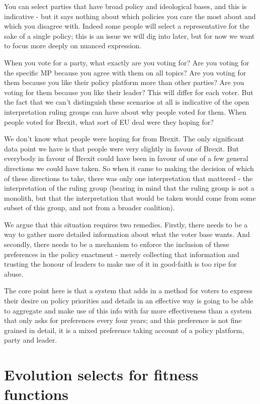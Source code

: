 \documentclass[twoside]{article}
\theoremstyle{definition}
\begin{document}
You can select parties that have broad policy and ideological bases, and this is indicative - but it says nothing about which policies you care the most about and which you disagree with. Indeed some people will select a representative for the sake of a single policy; this is an issue we will dig into later, but for now we want to focus more deeply on nuanced expression.

When you vote for a party, what exactly are you voting for? Are you voting for the specific MP because you agree with them on all topics? Are you voting for them because you like their policy platform more than other parties? Are you voting for them because you like their leader? This will differ for each voter. But the fact that we can’t distinguish these scenarios at all is indicative of the open interpretation ruling groups can have about why people voted for them. When people voted for Brexit, what sort of EU deal were they hoping for?

We don’t know what people were hoping for from Brexit. The only significant data point we have is that people were very slightly in favour of Brexit. But everybody in favour of Brexit could have been in favour of one of a few general directions we could have taken. So when it came to making the decision of which of these directions to take, there was only one interpretation that mattered - the interpretation of the ruling group (bearing in mind that the ruling group is not a monolith, but that the interpretation that would be taken would come from some subset of this group, and not from a broader coalition).

We argue that this situation requires two remedies. Firstly, there needs to be a way to gather more detailed information about what the voter base wants. And secondly, there needs to be a mechanism to enforce the inclusion of these preferences in the policy enactment - merely collecting that information and trusting the honour of leaders to make use of it in good-faith is too ripe for abuse.

The core point here is that a system that adds in a method for voters to express their desire on policy priorities and details in an effective way is going to be able to aggregate and make use of this info with far more effectiveness than a system that only asks for preferences every four years; and this preference is not fine grained in detail, it is a mixed preference taking account of a policy platform, party and leader.

\section{Evolution selects for fitness functions}
\end{document}
